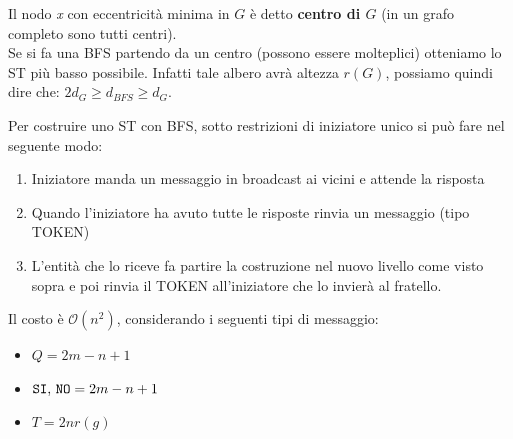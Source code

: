 Il nodo \emph{x} con eccentricità minima in $G$ è detto \textbf{centro di $G$}
(in un grafo completo sono tutti centri).\\

Se si fa una BFS partendo da un centro (possono essere molteplici) otteniamo lo
ST più basso possibile. Infatti tale albero avrà altezza $r(G)$, possiamo quindi
dire che: $2 d_G \geq d_{BFS} \geq d_G$.

Per costruire uno ST con BFS, sotto restrizioni di iniziatore unico si può fare
nel seguente modo:

\begin{enumerate}
    \item Iniziatore manda un messaggio in broadcast ai vicini e attende la risposta
    \item Quando l'iniziatore ha avuto tutte le risposte rinvia un messaggio (tipo
          TOKEN)
    \item L'entità che lo riceve fa partire la costruzione nel nuovo livello
          come visto sopra e poi rinvia il TOKEN all'iniziatore che lo invierà
          al fratello.
\end{enumerate}

Il costo è $\mathcal{O}(n^2)$, considerando i seguenti tipi di messaggio:
\begin{itemize}
    \item $Q = 2m - n +1$
    \item $\text{\texttt{SI}, \texttt{NO}} = 2m -n +1$
    \item $T = 2n r(g)$
\end{itemize}
